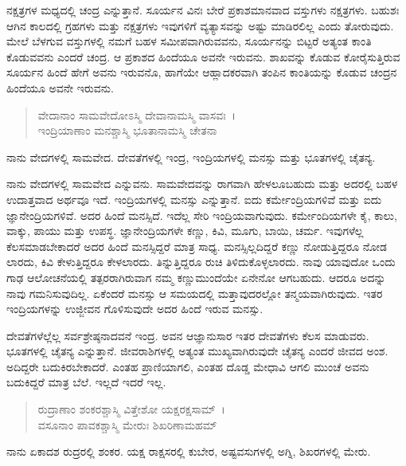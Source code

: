 ನಕ್ಷತ್ರಗಳ ಮಧ್ಯದಲ್ಲಿ ಚಂದ್ರ ಎನ್ನುತ್ತಾನೆ. ಸೂರ್ಯನ ವಿನಃ ಬೇರೆ ಪ್ರಕಾಶಮಾನವಾದ ವಸ್ತುಗಳು ನಕ್ಷತ್ರಗಳು. ಬಹುಶಃ ಆಗಿನ ಕಾಲದಲ್ಲಿ ಗ್ರಹಗಳು ಮತ್ತು ನಕ್ಷತ್ರಗಳು ಇವುಗಳಿಗೆ ವ್ಯತ್ಯಾಸವನ್ನು ಅಷ್ಟು ಮಾಡಿರಲಿಲ್ಲ ಎಂದು ತೋರುವುದು. ಮೇಲೆ ಬೆಳಗುವ ವಸ್ತುಗಳಲ್ಲಿ ನಮಗೆ ಬಹಳ ಸಮೀಪವಾಗಿರುವವನು, ಸೂರ್ಯನನ್ನು ಬಿಟ್ಟರೆ ಅತ್ಯಂತ ಕಾಂತಿ ಕೊಡುವವನು ಎಂದರೆ ಚಂದ್ರ. ಆ ಪ್ರಕಾಶದ ಹಿಂದೆಯೂ ಅವನೇ ಇರುವನು. ಶಾಖವನ್ನು ಕೊಡುವ ಕೋರೈಸುತ್ತಿರುವ ಸೂರ್ಯನ ಹಿಂದೆ ಹೇಗೆ ಅವನು ಇರುವನೊ, ಹಾಗೆಯೇ ಆಹ್ಲಾದಕರವಾಗಿ ತಂಪಿನ ಕಾಂತಿಯನ್ನು ಕೊಡುವ ಚಂದ್ರನ ಹಿಂದೆಯೂ ಅವನೇ ಇರುವನು.

\begin{verse}
ವೇದಾನಾಂ ಸಾಮವೇದೋಽಸ್ಮಿ ದೇವಾನಾಮಸ್ಮಿ ವಾಸವಃ~।\\ಇಂದ್ರಿಯಾಣಾಂ ಮನಶ್ಚಾಸ್ಮಿ ಭೂತಾನಾಮಸ್ಮಿ ಚೇತನಾ 
\end{verse}

{\small ನಾನು ವೇದಗಳಲ್ಲಿ ಸಾಮವೇದ. ದೇವತೆಗಳಲ್ಲಿ ಇಂದ್ರ, ಇಂದ್ರಿಯಗಳಲ್ಲಿ ಮನಸ್ಸು ಮತ್ತು ಭೂತಗಳಲ್ಲಿ ಚೈತನ್ಯ.}

ನಾನು ವೇದಗಳಲ್ಲಿ ಸಾಮವೇದ ಎನ್ನುವನು. ಸಾಮವೇದವನ್ನು ರಾಗವಾಗಿ ಹೇಳಲೂಬಹುದು ಮತ್ತು ಅದರಲ್ಲಿ ಬಹಳ ಉದಾತ್ತವಾದ ಅರ್ಥವೂ ಇದೆ. ಇಂದ್ರಿಯಗಳಲ್ಲಿ ಮನಸ್ಸು ಎನ್ನುತ್ತಾನೆ. ಐದು ಕರ್ಮೇಂದ್ರಿಯಗಳಿವೆ ಮತ್ತು ಐದು ಜ್ಞಾನೇಂದ್ರಿಯಗಳಿವೆ. ಅದರ ಹಿಂದೆ ಮನಸ್ಸಿದೆ. ಇದೆಲ್ಲ ಸೇರಿ ಇಂದ್ರಿಯವಾಗುವುದು. ಕರ್ಮೇಂದಿಯಗಳೇ ಕೈ, ಕಾಲು, ವಾಕ್ಕು, ಪಾಯು ಮತ್ತು ಉಪಸ್ಥ. ಜ್ಞಾನೇಂದ್ರಿಯಗಳೇ ಕಣ್ಣು, ಕಿವಿ, ಮೂಗು, ಬಾಯಿ, ಚರ್ಮ. ಇವುಗಳೆಲ್ಲ ಕೆಲಸಮಾಡಬೇಕಾದರೆ ಅದರ ಹಿಂದೆ ಮನಸ್ಸಿದ್ದರೆ ಮಾತ್ರ ಸಾಧ್ಯ. ಮನಸ್ಸಿಲ್ಲದಿದ್ದರೆ ಕಣ್ಣು ನೋಡುತ್ತಿದ್ದರೂ ನೋಡ ಲಾರದು, ಕಿವಿ ಕೇಳುತ್ತಿದ್ದರೂ ಕೇಳಲಾರದು. ತಿನ್ನುತ್ತಿದ್ದರೂ ರುಚಿ ತಿಳಿದುಕೊಳ್ಳಲಾರದು. ನಾವು ಯಾವುದೋ ಒಂದು ಗಾಢ ಆಲೋಚನೆಯಲ್ಲಿ ತತ್ಪರರಾಗಿರುವಾಗ ನಮ್ಮ ಕಣ್ಣುಮುಂದೆಯೇ ಏನೇನೋ ಆಗಬಹುದು. ಆದರೂ ಅದನ್ನು ನಾವು ಗಮನಿಸುವುದಿಲ್ಲ. ಏಕೆಂದರೆ ಮನಸ್ಸು ಆ ಸಮಯದಲ್ಲಿ ಮತ್ತಾವುದರಲ್ಲೋ ತನ್ಮಯವಾಗಿರುವುದು. ಇತರ ಇಂದ್ರಿಯಗಳನ್ನು ಉಜ್ಜೀವನ ಗೊಳಿಸುವುದೇ ಅದರ ಹಿಂದೆ ಇರುವ ಮನಸ್ಸು.

ದೇವತೆಗಳೆಲ್ಲೆಲ್ಲ ಸರ್ವಶ್ರೇಷ್ಠನಾದವನೆ ಇಂದ್ರ. ಅವನ ಆಜ್ಞಾನುಸಾರ ಇತರ ದೇವತೆಗಳು ಕೆಲಸ ಮಾಡುವರು. ಭೂತಗಳಲ್ಲಿ ಚೈತನ್ಯ ಎನ್ನುತ್ತಾನೆ. ಜೀವರಾಶಿಗಳಲ್ಲಿ ಅತ್ಯಂತ ಮುಖ್ಯವಾಗಿರುವುದೇ ಚೈತನ್ಯ ಎಂದರೆ ಜೀವದ ಅಂಶ. ಅದಿದ್ದರೇ ಬದುಕಿರಬೇಕಾದರೆ. ಎಂತಹ ಪ್ರಾಣಿಯಾಗಲಿ, ಎಂತಹ ದೊಡ್ಡ ಮೇಧಾವಿ ಆಗಲಿ ಮುಂಚೆ ಅವನು ಬದುಕಿದ್ದರೆ ಮಾತ್ರ ಬೆಲೆ. ಇಲ್ಲದೆ ಇದರೆ ಇಲ್ಲ.

\begin{verse}
ರುದ್ರಾಣಾಂ ಶಂಕರಶ್ಚಾಸ್ಮಿ ವಿತ್ತೇಶೋ ಯಕ್ಷರಕ್ಷಸಾಮ್~।\\ವಸೂನಾಂ ಪಾವಕಶ್ಚಾಸ್ಮಿ ಮೇರುಃ ಶಿಖರಿಣಾಮಹಮ್ 
\end{verse}

{\small ನಾನು ಏಕಾದಶ ರುದ್ರರಲ್ಲಿ ಶಂಕರ. ಯಕ್ಷ ರಾಕ್ಷಸರಲ್ಲಿ ಕುಬೇರ, ಅಷ್ಟವಸುಗಳಲ್ಲಿ ಅಗ್ನಿ, ಶಿಖರಗಳಲ್ಲಿ ಮೇರು.}

